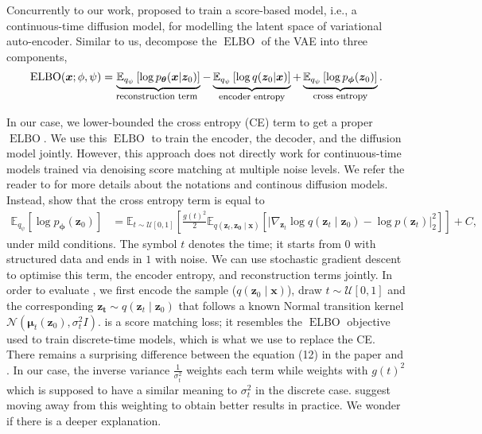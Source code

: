 Concurrently to our work, \citet{vahdat2021score} proposed to train a score-based model, i.e., a continuous-time diffusion model, for modelling the latent space of variational auto-encoder. Similar to us, \citet{vahdat2021score} decompose the $\operatorname{ELBO}$ of the VAE into three components,
\begin{align}
  \operatorname{ELBO}(\mathbf{x}; \phi, \psi) =
  \underbrace{\mathbb{E}_{q_\psi}\left[ \log p_{\mathbf{\theta}}(\mathbf{x}|\mathbf{z}_0)\right]}_{\text{\footnotesize reconstruction term }} -
  \underbrace{\mathbb{E}_{q_\psi}\left[\log q(\mathbf{z}_0|\mathbf{x})\right]}_{\text{\footnotesize{encoder entropy}}} +
  \underbrace{\mathbb{E}_{q_\psi}\left[\log p_{\mathbf{\phi}}(\mathbf{z}_0)\right]}_{\text{\footnotesize{cross entropy}}}.
\end{align}

In our case, we lower-bounded the cross entropy (CE) term to get a proper $\operatorname{ELBO}$. We use this $\operatorname{ELBO}$ to train the encoder, the decoder, and the diffusion model jointly. However, this approach does not directly work for continuous-time models trained via denoising score matching at multiple noise levels. We refer the reader to  for more details about the notations and continous diffusion models. Instead, \citet{vahdat2021score} show that the cross entropy term is equal to
\begin{align}
  \mathbb{E}_{q_\psi}\left[\log p_{\mathbf{\phi}}(\mathbf{z}_0)\right] &= \mathbb{E}_{t \sim \mathcal{U}\left[0, 1\right]}\left[ \frac{g(t)^2}{2} \mathbb{E}_{q(\bm{z}_t, \bm{z_0} \mid \bm{x})}\left[ \lvert \nabla_{\bm{z}_t} \log q(\bm{z}_t \mid \bm{z}_0) - \log p(\bm{z}_t) \rvert_2^2 \right] \right] + C, \label{eq:CE_continuous_diffusion_bis}
\end{align}
under mild conditions. The symbol $t$ denotes the time; it starts from $0$ with structured data and ends in $1$ with noise. We can use stochastic gradient descent to optimise this term, the encoder entropy, and reconstruction terms jointly. In order to evaluate , we first encode the sample ($q(\bm{z}_0 \mid \bm{x})$), draw $t\sim \mathcal{U}\left[0, 1\right]$ and the corresponding $\bm{z_t} \sim q(\bm{z}_t \mid \bm{z}_0)$ that follows a known Normal transition kernel $\mathcal{N}\left( \bm{\mu}_t(\bm{z}_0), \sigma_t^2 I \right)$. \label{eq:CE_continuous_diffusion_bis} is a score matching loss; it resembles the $\operatorname{ELBO}$ objective used to train discrete-time models, which is what we use to replace the CE. There remains a surprising difference between the equation (12) in the paper and . In our case, the inverse variance $\frac{1}{\sigma_t^2}$ weights each term while  weights with $g(t)^2$ which is supposed to have a similar meaning to $\sigma_t^2$ in the discrete case. \citet{vahdat2021score} suggest moving away from this weighting to obtain better results in practice. We wonder if there is a deeper explanation.

